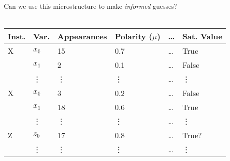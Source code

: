 \begin{frame}
Can we use this microstructure to make \emph{informed} guesses?
\ \\
\ \\
\begin{center}
\begin{tabular}{llllll}
\toprule
{\bf Inst.} & {\bf Var.} & {\bf Appearances} & {\bf Polarity ($\mu$)} & {\bf \dots} & {\bf Sat. Value}\\
\midrule
X & $x_0$ & 15 & 0.7 & \dots & True\\
  & $x_1$ & 2 & 0.1 & \dots & False\\
  & \vdots & \vdots & \vdots & \dots & \vdots\\
X & $x_0$ & 3 & 0.2 & \dots & False\\
  & $x_1$ & 18 & 0.6 & \dots & True\\
  & \vdots & \vdots & \vdots & \dots & \vdots\\
Z & $z_0$ & 17 & 0.8 & \dots & True?\\
  & \vdots & \vdots & \vdots & \dots & \vdots\\
\bottomrule
\end{tabular}
\end{center}
\end{frame}

